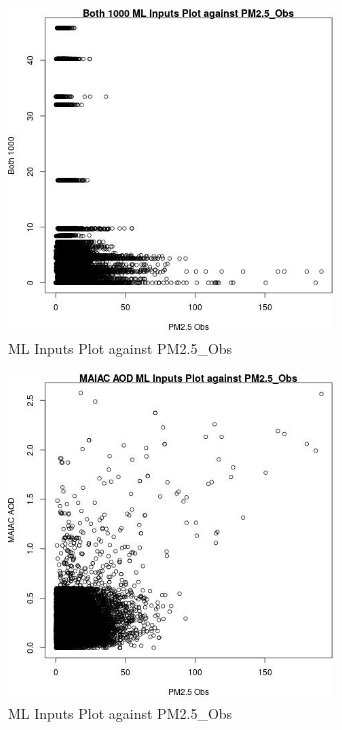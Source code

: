\begin{figure} 
\centering  
\includegraphics[width=0.77\textwidth]{Code_Outputs/Report_ML_input_PM25_Step4_part_e_de_duplicated_aves_Both_1000vPM25_Obs.jpg} 
\caption{\label{fig:Report_ML_input_PM25_Step4_part_e_de_duplicated_avesBoth_1000vPM25_Obs}ML Inputs Plot against PM2.5_Obs} 
\end{figure} 
 

\begin{figure} 
\centering  
\includegraphics[width=0.77\textwidth]{Code_Outputs/Report_ML_input_PM25_Step4_part_e_de_duplicated_aves_MAIAC_AODvPM25_Obs.jpg} 
\caption{\label{fig:Report_ML_input_PM25_Step4_part_e_de_duplicated_avesMAIAC_AODvPM25_Obs}ML Inputs Plot against PM2.5_Obs} 
\end{figure} 
 


